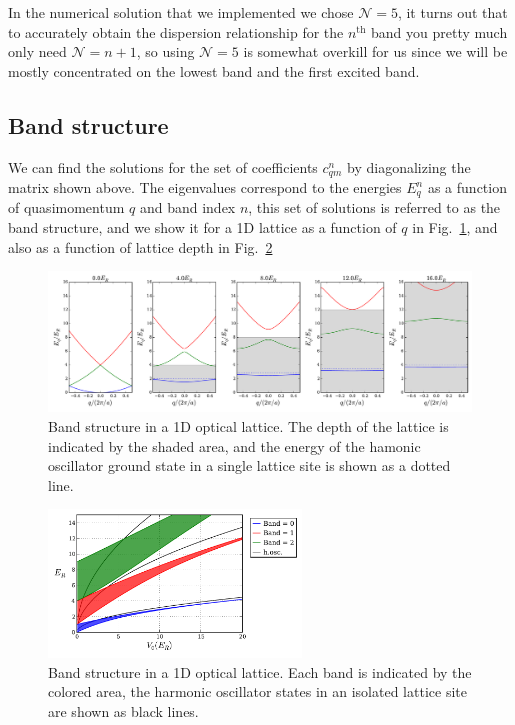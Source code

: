 \documentclass[oneside,11pt]{memoir}
\begin{document}
In the numerical solution that  we implemented we chose $\mathcal{N}=5$,  it
turns out that to accurately obtain the dispersion relationship for the
$n^\mathrm{th}$ band you pretty much only need $\mathcal{N}=n+1$, so using
$\mathcal{N}=5$ is somewhat overkill for us since we will be mostly
concentrated on the lowest band and the first excited band.  

\subsection{Band structure}

We can find the solutions for the set of coefficients $c_{qm}^{n}$ by
diagonalizing the matrix shown above.  The eigenvalues correspond to the
energies $E_{q}^{n}$ as a function of quasimomentum $q$ and band index $n$,
this set of solutions is referred to as the band structure, and we show it for
a 1D lattice as a function of $q$ in Fig.~\ref{fig:bands1d}, and also as a
function of lattice depth in Fig.~\ref{fig:bands1d_V0} 
\begin{figure}
\centering \includegraphics[width=\textwidth]{../figures/BandStructure_figures/bands1d.pdf}
\caption[Band structure in 1D lattice.]{\small Band structure in a 1D optical
lattice.  The depth of the lattice is indicated by the shaded area, and the
energy of the hamonic oscillator ground state in a single lattice site is shown
as a dotted line.  } \label{fig:bands1d}
\end{figure}
\begin{figure}
\centering \includegraphics[width=0.6\textwidth]{../figures/BandStructure_figures/bands1d_V0.pdf}
\caption[Band structure in 1D lattice.]{\small Band structure in a 1D optical
lattice.  Each band is indicated by the colored area,  the harmonic oscillator
states in an isolated lattice site are shown as black lines. }
\label{fig:bands1d_V0}
\end{figure}
\end{document}
